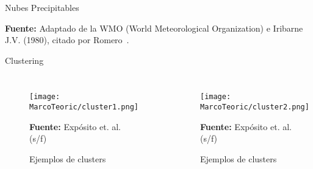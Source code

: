 \documentclass[aspectratio=169,xcolor=dvipsnames]{beamer}
\begin{document}
\begin{frame}{Nubes Precipitables}
   \begin{table}[h]
    \centering
    \scriptsize %
    \caption{Género, abreviación y altura en la atmósfera de las nubes.}
    \scriptsize \textbf{Fuente:} Adaptado de la WMO (World Meteorological Organization) e Iribarne J.V. (1980), citado por Romero~\cite{b7}.
    \end{table}
\end{frame}

\begin{frame}{Clustering}
    \begin{columns}

        \begin{figure}
            \centering
            \texttt{[image: MarcoTeoric/cluster1.png]}
            {\footnotesize %
            \caption{Ejemplos de clusters}
            \label{fig6}
            \vspace{-7pt}
            {\tiny
                \textbf{Fuente:} Expósito et. al. (s/f)
            }}
        \end{figure}
        \begin{figure}
            \centering
            \texttt{[image: MarcoTeoric/cluster2.png]}
            {\footnotesize %
            \caption{Ejemplos de clusters}
            \label{fig7}
            \vspace{-7pt}
            {\tiny
                \textbf{Fuente:} Expósito et. al. (s/f)
            }}
        \end{figure}

    \end{columns}
\end{frame}
\end{document}
